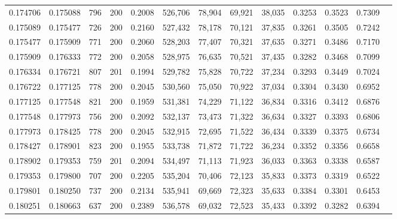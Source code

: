 \begin{tabular}{rrrrrrrrrrrrr}
0.174706 & 0.175088 &    796 & 200 &                                     0.2008 & 526,706 &  78,904 &  69,921 &  38,035 & 0.3253 & 0.3523 & 0.7309 \\
0.175089 & 0.175477 &    726 & 200 &                                     0.2160 & 527,432 &  78,178 &  70,121 &  37,835 & 0.3261 & 0.3505 & 0.7242 \\
0.175477 & 0.175909 &    771 & 200 &                                     0.2060 & 528,203 &  77,407 &  70,321 &  37,635 & 0.3271 & 0.3486 & 0.7170 \\
0.175909 & 0.176333 &    772 & 200 &                                     0.2058 & 528,975 &  76,635 &  70,521 &  37,435 & 0.3282 & 0.3468 & 0.7099 \\
0.176334 & 0.176721 &    807 & 201 &                                     0.1994 & 529,782 &  75,828 &  70,722 &  37,234 & 0.3293 & 0.3449 & 0.7024 \\
0.176722 & 0.177125 &    778 & 200 &                                     0.2045 & 530,560 &  75,050 &  70,922 &  37,034 & 0.3304 & 0.3430 & 0.6952 \\
0.177125 & 0.177548 &    821 & 200 &                                     0.1959 & 531,381 &  74,229 &  71,122 &  36,834 & 0.3316 & 0.3412 & 0.6876 \\
0.177548 & 0.177973 &    756 & 200 &                                     0.2092 & 532,137 &  73,473 &  71,322 &  36,634 & 0.3327 & 0.3393 & 0.6806 \\
0.177973 & 0.178425 &    778 & 200 &                                     0.2045 & 532,915 &  72,695 &  71,522 &  36,434 & 0.3339 & 0.3375 & 0.6734 \\
0.178427 & 0.178901 &    823 & 200 &                                     0.1955 & 533,738 &  71,872 &  71,722 &  36,234 & 0.3352 & 0.3356 & 0.6658 \\
0.178902 & 0.179353 &    759 & 201 &                                     0.2094 & 534,497 &  71,113 &  71,923 &  36,033 & 0.3363 & 0.3338 & 0.6587 \\
0.179353 & 0.179800 &    707 & 200 &                                     0.2205 & 535,204 &  70,406 &  72,123 &  35,833 & 0.3373 & 0.3319 & 0.6522 \\
0.179801 & 0.180250 &    737 & 200 &                                     0.2134 & 535,941 &  69,669 &  72,323 &  35,633 & 0.3384 & 0.3301 & 0.6453 \\
0.180251 & 0.180663 &    637 & 200 &                                     0.2389 & 536,578 &  69,032 &  72,523 &  35,433 & 0.3392 & 0.3282 & 0.6394 \\

\end{tabular}
